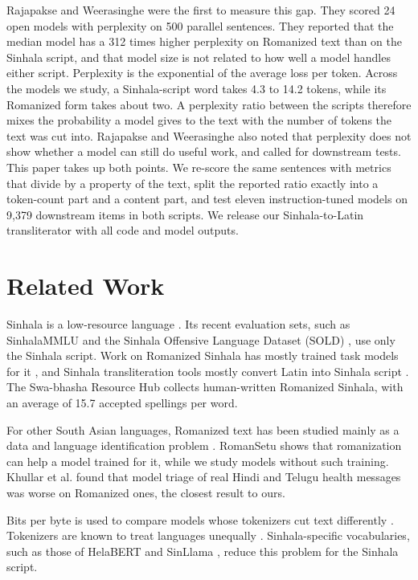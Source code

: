 \documentclass[3p,times,procedia]{elsarticle}
\begin{document}
Rajapakse and Weerasinghe \cite{rajapakse} were the first to measure this gap. They scored 24 open models with perplexity on 500 parallel sentences. They reported that the median model has a 312 times higher perplexity on Romanized text than on the Sinhala script, and that model size is not related to how well a model handles either script. Perplexity is the exponential of the average loss per token. Across the models we study, a Sinhala-script word takes 4.3 to 14.2 tokens, while its Romanized form takes about two. A perplexity ratio between the scripts therefore mixes the probability a model gives to the text with the number of tokens the text was cut into. Rajapakse and Weerasinghe also noted that perplexity does not show whether a model can still do useful work, and called for downstream tests. This paper takes up both points. We re-score the same sentences with metrics that divide by a property of the text, split the reported ratio exactly into a token-count part and a content part, and test eleven instruction-tuned models on 9{,}379 downstream items in both scripts. We release our Sinhala-to-Latin transliterator with all code and model outputs.

\section{Related Work}
\label{sec:related}

Sinhala is a low-resource language \cite{desilva-survey}. Its recent evaluation sets, such as SinhalaMMLU \cite{sinhalammlu} and the Sinhala Offensive Language Dataset (SOLD) \cite{sold}, use only the Sinhala script. Work on Romanized Sinhala has mostly trained task models for it \cite{chamikara}, and Sinhala transliteration tools mostly convert Latin into Sinhala script \cite{demel,swabhasha}. The Swa-bhasha Resource Hub \cite{swabhasha} collects human-written Romanized Sinhala, with an average of 15.7 accepted spellings per word.

For other South Asian languages, Romanized text has been studied mainly as a data and language identification problem \cite{dakshina}. RomanSetu \cite{romansetu} shows that romanization can help a model trained for it, while we study models without such training. Khullar et al. \cite{scriptgap} found that model triage of real Hindi and Telugu health messages was worse on Romanized ones, the closest result to ours.

Bits per byte is used to compare models whose tokenizers cut text differently \cite{pile,paloma}. Tokenizers are known to treat languages unequally \cite{petrov,velayuthan}. Sinhala-specific vocabularies, such as those of HelaBERT \cite{helabert} and SinLlama \cite{sinllama}, reduce this problem for the Sinhala script.
\end{document}

